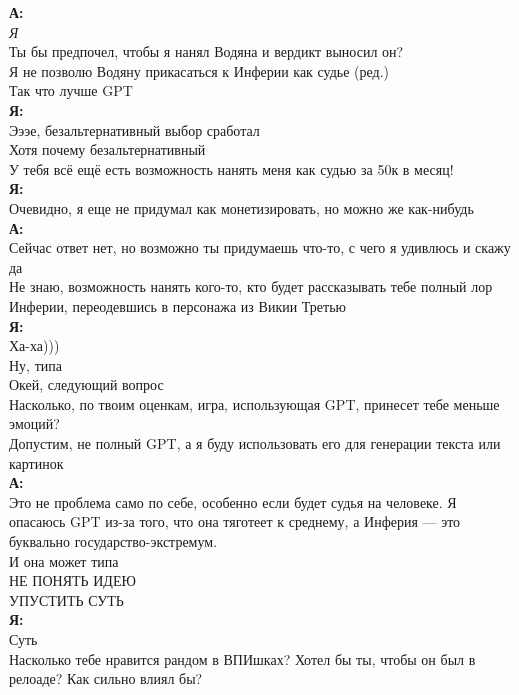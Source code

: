 \begin{tabbing}
\textbf{А:}\\
\textit{Я}\\
Ты бы предпочел, чтобы я нанял Водяна и вердикт выносил он?\\
Я не позволю Водяну прикасаться к Инферии как судье (ред.)\\
Так что лучше GPT\\

\textbf{Я:}\\
Эээе, безальтернативный выбор сработал\\
Хотя почему безальтернативный\\
У тебя всё ещё есть возможность нанять меня как судью за 50к в месяц!\\

\textbf{Я:}\\
Очевидно, я еще не придумал как монетизировать, но можно же как-нибудь\\

\textbf{А:}\\
Сейчас ответ нет, но возможно ты придумаешь что-то, с чего я удивлюсь и скажу да\\
Не знаю, возможность нанять кого-то, кто будет рассказывать тебе полный лор Инферии, переодевшись в персонажа из Викии Третью\\

\textbf{Я:}\\
Ха-ха)))\\
Ну, типа\\
Окей, следующий вопрос\\
Насколько, по твоим оценкам, игра, использующая GPT, принесет тебе меньше эмоций?\\
Допустим, не полный GPT, а я буду использовать его для генерации текста или картинок\\

\textbf{А:}\\
Это не проблема само по себе, особенно если будет судья на человеке. Я опасаюсь GPT из-за того, что она тяготеет к среднему, а Инферия — это буквально государство-экстремум.\\
И она может типа\\
НЕ ПОНЯТЬ ИДЕЮ\\
УПУСТИТЬ СУТЬ\\

\textbf{Я:}\\
Суть\\
Насколько тебе нравится рандом в ВПИшках? Хотел бы ты, чтобы он был в релоаде? Как сильно влиял бы?\\


\end{tabbing}
